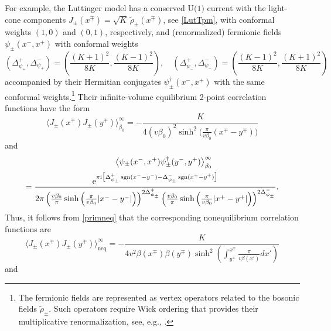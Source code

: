 \documentclass[12pt,a4paper]{article}
\newcommand{\ee}{{\rm e}}
\newcommand{\ii}{{\rm i}}
\def\sgn{\operatorname{sgn}}
\theoremstyle{definition}
\theoremstyle{remark}
\begin{document}
For example, the Luttinger model has a conserved $\text{U(1)}$ current with the light-cone components $J_{\pm}(x^\mp) = \sqrt{K}\,\tilde{\rho}_{\pm}(x^\mp)$, see \eqref{LutTpm}, with conformal weights $(1,0)$ and $(0,1)$, respectively, and (renormalized) fermionic fields $\psi_{\pm}(x^-,x^+)$ with conformal weights
%
\begin{equation}
\left( \Delta^{+}_{\psi_{+}},\Delta^{-}_{\psi_{+}} \right)
= \left(\frac{(K+1)^2}{8K},\frac{(K-1)^2}{8K}\right),
\quad
\left( \Delta^{+}_{\psi_{-}},\Delta^{-}_{\psi_{-}} \right)
= \left(\frac{(K-1)^2}{8K},\frac{(K+1)^2}{8K}\right)
\end{equation}
%
accompanied by their Hermitian conjugates $\psi^\dagger_{\pm}(x^-,x^+)$ with the same conformal weights.\footnote{The fermionic fields are represented
as vertex operators related to the bosonic fields $\tilde\rho_\pm$.
Such operators require Wick ordering that provides their multiplicative
renormalization, see, e.g., \cite{LaMo}.}
Their infinite-volume equilibrium 2-point correlation functions have the form
%
\begin{equation}
\bigl\langle J_{\pm}(x^\mp)J_{\pm}(y^\mp) \bigr\rangle^\infty_{\beta_0}
= -\frac{K}{4 (v\beta_0)^2
  	\sinh^2\big(\frac{\pi}{v\beta_0}(x^\mp-y^\mp)\big)}
\end{equation}
%
and
%
\begin{multline}
\hspace*{1cm}\bigl\langle \psi_{\pm}(x^-,x^+)\psi^\dagger_{\pm}(y^-,y^+) 
\big\rangle^\infty_{\beta_0} \\
= \frac{
		\ee^{\pi \ii \bigl[
			\Delta^{+}_{\psi_{\pm}} \sgn(x^{-}-y^{-})
			- \Delta^{-}_{\psi_{\pm}}\sgn(x^{+}-y^{+})
		\bigr]}
	}{
		2\pi
		\left(
			\frac{v\beta_0}{\pi}
			\sinh \left( \frac{\pi}{v\beta_0} |x^{-}-y^{-}| \right)
		\right)^{2\Delta^{+}_{\psi_{\pm}}}
		\left(
			\frac{v\beta_0}{\pi}
			\sinh \left( \frac{\pi}{v\beta_0} |x^{+}-y^{+}| \right)
		\right)^{2\Delta^{-}_{\psi_{\pm}}}
	}.
\end{multline}  
%
Thus, it follows from \eqref{primneq} that the corresponding nonequilibrium correlation functions are
%
\begin{equation}
\bigl\langle J_{\pm}(x^\mp)J_{\pm}(y^\mp) \bigr\rangle^\infty_{\text{neq}}
= -\frac{K}{4 v^2\beta(x^\mp)\beta(y^\mp)
  	\sinh^2 \left( \int_{y^\mp}^{x^\mp} \frac{\pi}{v\beta(x')} dx' \right)}
\end{equation}
%
and
%
\end{document}
